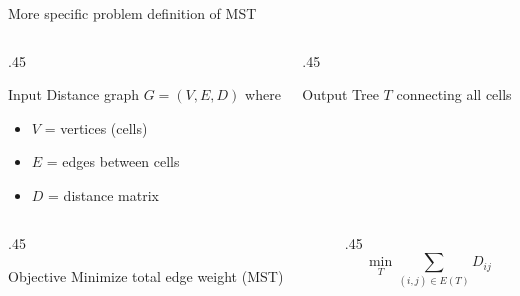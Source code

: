 \documentclass[
  12pt,
  ignorenonframetext,
  aspectratio=169]{beamer}
\begin{document}
\begin{frame}{More specific problem definition of MST}
\protect{}\label{more-specific-problem-definition-of-mst}
\begin{columns}[T]
\begin{column}{.45\linewidth}
\begin{block}{Input}
\protect{}\label{input-2}
Distance graph \(G = (V, E, D)\) where

\begin{itemize}
\item
  \(V\) = vertices (cells)
\item
  \(E\) = edges between cells
\item
  \(D\) = distance matrix
\end{itemize}
\end{block}
\end{column}

\begin{column}{.45\linewidth}
\begin{block}{Output}
\protect{}\label{output-2}
Tree \(T\) connecting all cells
\end{block}
\end{column}
\end{columns}

\vfill

\begin{columns}[T]
\begin{column}{.45\linewidth}
\begin{block}{Objective}
\protect{}\label{objective}
Minimize total edge weight (MST)
\end{block}
\end{column}

\begin{column}{.45\linewidth}
\[
\min_{T} \sum_{(i,j) \in E(T)} D_{ij}
\]
\end{column}
\end{columns}
\end{frame}
\end{document}
